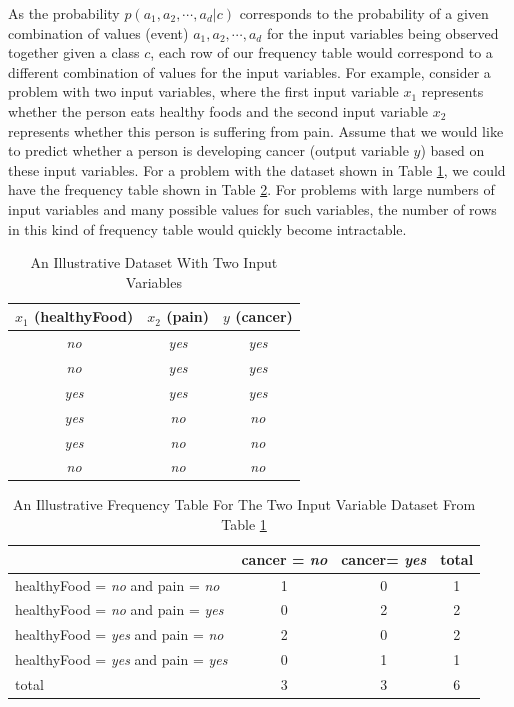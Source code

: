 As the probability $p(a_1,a_2,\cdots,a_d|c)$ corresponds to the probability of a given combination of values (event) $a_1,a_2,\cdots,a_d$ for the input variables being observed together given a class $c$, each row of our frequency table would correspond to a different combination of values for the input variables. For example, consider a problem with two input variables, where the first input variable $x_1$ represents whether the person eats healthy foods and the second input variable $x_2$ represents whether this person is suffering from pain. Assume that we would like to predict whether a person is developing cancer (output variable $y$) based on these input variables. For a problem with the dataset shown in Table \ref{tab:dataset-2dim}, we could have the frequency table shown in Table \ref{tab:frequency-2dim}. For problems with large numbers of input variables and many possible values for such variables, the number of rows in this kind of frequency table would quickly become intractable. 


\begin{table}[ht]
\centering
\caption{An Illustrative Dataset With Two Input Variables} \label{tab:dataset-2dim}
\begin{tabular}{|c|c||c|} \hline
$x_1$ (healthyFood) & $x_2$ (pain) & $y$ (cancer) \\ \hline
\textit{no} & \textit{yes} & \textit{yes} \\
\textit{no} & \textit{yes} & \textit{yes} \\
\textit{yes} & \textit{yes} & \textit{yes} \\
\textit{yes} & \textit{no} & \textit{no} \\
\textit{yes} & \textit{no} & \textit{no} \\
\textit{no} & \textit{no} & \textit{no} \\ \hline
\end{tabular}
\end{table}

\begin{table}[ht]
\centering
\caption{An Illustrative Frequency Table For The Two Input Variable Dataset From Table \ref{tab:dataset-2dim}} \label{tab:frequency-2dim}
\begin{tabular}{|l|c|c|c|} \hline
 & cancer = \textit{no}  & cancer= \textit{yes} & total \\ \hline
healthyFood = \textit{no} and pain = \textit{no} & 1 & 0 & 1 \\ \hline
healthyFood = \textit{no} and pain = \textit{yes} & 0 & 2 & 2 \\ \hline
healthyFood = \textit{yes} and pain = \textit{no} & 2 & 0 & 2 \\ \hline
healthyFood = \textit{yes} and pain = \textit{yes} & 0 & 1 & 1 \\ \hline
total & 3 & 3 & 6 \\ \hline
\end{tabular}
\end{table}


